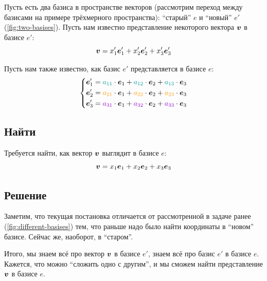 \documentclass[a4paper,12pt]{article}
\begin{document}
  Пусть есть два базиса в пространстве векторов (рассмотрим переход между базисами на примере трёхмерного пространства): ``старый'' $e$ и ``новый'' $e'$ (\ref{fig:two-basises}).
  Пусть нам известно представление некоторого вектора $\boldsymbol v$ в базисе $e'$:
  \[
    \boldsymbol v = x_1' \boldsymbol e_1' + x_2' \boldsymbol e_2' + x_3' \boldsymbol e_3'
  \]
  
  Пусть нам также известно, как базис $e'$ представляется в базисе $e$:
  \begin{equation}\label{eq:e1-to-e2-via-system-of-equations}
    \left\{
      \begin{aligned}
        &\bds e_1' = \textcolor{my-cyan}{a_{11}} \cdot \bds e_1 + \textcolor{my-cyan}{a_{12}} \cdot \bds e_2 + \textcolor{my-cyan}{a_{13}} \cdot \bds e_3\\
        &\bds e_2' = \textcolor{my-orange}{a_{21}} \cdot \bds e_1 + \textcolor{my-orange}{a_{22}} \cdot \bds e_2 + \textcolor{my-orange}{a_{23}} \cdot \bds e_3\\
        &\bds e_3' = \textcolor{my-purple}{a_{31}} \cdot \bds e_1 + \textcolor{my-purple}{a_{32}} \cdot \bds e_2 + \textcolor{my-purple}{a_{33}} \cdot \bds e_3
      \end{aligned}
    \right.
  \end{equation}
  
  
  \subsection*{Найти}
  
  Требуется найти, как вектор $\boldsymbol v$ выглядит в базисе $e$:
  \[
    \boldsymbol v = x_1 \boldsymbol e_1 + x_2 \boldsymbol e_2 + x_3 \boldsymbol e_3
  \]
  
  
  \subsection*{Решение}
  
  Заметим, что текущая постановка отличается от рассмотренной в задаче ранее (\ref{fig:different-basises}) тем, что раньше надо было найти координаты в ``новом'' базисе.
  Сейчас же, наоборот, в ``старом''.
  
  Итого, мы знаем всё про вектор $\boldsymbol v$ в базисе $e'$, знаем всё про базис $e'$ в базисе $e$.
  Кажется, что можно ``сложить одно с другим'', и мы сможем найти представление $\boldsymbol v$ в базисе $e$.
  
\end{document}
